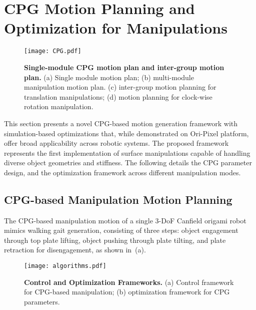 \section{CPG Motion Planning and Optimization for Manipulations}
\label{sec:motion_optimization}

\begin{figure*}[t]
    \centering
    \texttt{[image: CPG.pdf]}
    \caption{\textbf{Single-module CPG motion plan and inter-group motion plan. }(a) Single module motion plan; (b) multi-module manipulation motion plan. (c) inter-group motion planning for translation manipulations; (d) motion planning for clock-wise rotation manipulation.
    }
    \label{fig:CPG}
\end{figure*}

This section presents a novel CPG-based motion generation framework with simulation-based optimizations that, while demonstrated on Ori-Pixel platform, offer broad applicability across robotic systems. The proposed framework represents the first implementation of surface manipulations capable of handling diverse object geometries and stiffness. The following details the CPG parameter design, and the optimization framework across different manipulation modes.

\subsection{CPG-based Manipulation Motion Planning}
\label{sec:CPG_plan}
The CPG-based manipulation motion of a single 3-DoF Canfield origami robot mimics walking gait generation, consisting of three steps: object engagement through top plate lifting, object pushing through plate tilting, and plate retraction for disengagement, as shown in~(a). 

\begin{figure*}[t]
    \centering
    \texttt{[image: algorithms.pdf]}
    \caption{\textbf{Control and Optimization Frameworks.} (a) Control framework for CPG-based manipulation; (b) optimization framework for CPG parameters.
    }
    \label{fig:alg}
\end{figure*}

